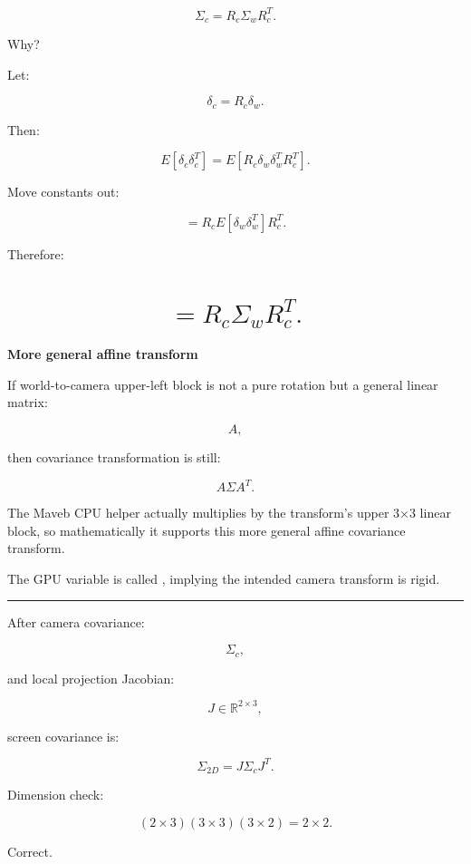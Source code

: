 \[
\boxed{
\Sigma_c
=
R_c
\Sigma_w
R_c^T.
}
\]

Why?

Let:

\[
\delta_c
=
R_c\delta_w.
\]

Then:

\[
E[
\delta_c
\delta_c^T
]
=
E[
R_c
\delta_w
\delta_w^T
R_c^T
].
\]

Move constants out:

\[
=
R_c
E[
\delta_w\delta_w^T
]
R_c^T.
\]

Therefore:

\section{\texorpdfstring{\[
=
R_c\Sigma_wR_c^T.
\]}{
=
R\_c\textbackslash Sigma\_wR\_c\^{}T.
}}\label{04-visual-computing-ii-ch038-r_csigma_wr_ct.}

\hypertarget{04-visual-computing-ii-ch038-r_csigma_wr_ct.}{}

\textbf{More general affine transform}

If world-to-camera upper-left block is not a pure rotation but a general linear matrix:

\[
A,
\]

then covariance transformation is still:

\[
\boxed{
A\Sigma A^T.
}
\]

The Maveb CPU helper actually multiplies by the transform's upper 3×3 linear block, so mathematically it supports this more general affine covariance transform.

The GPU variable is called , implying the intended camera transform is rigid.

\begin{center}\rule{0.5\linewidth}{0.5pt}\end{center}

After camera covariance:

\[
\Sigma_c,
\]

and local projection Jacobian:

\[
J\in\mathbb R^{2\times3},
\]

screen covariance is:

\[
\boxed{
\Sigma_{2D}
=
J
\Sigma_c
J^T.
}
\]

Dimension check:

\[
(2\times3)
(3\times3)
(3\times2)
=
2\times2.
\]

Correct.


